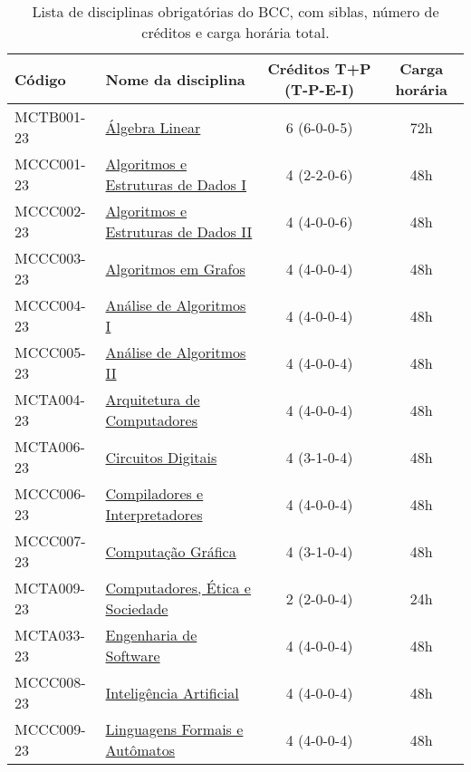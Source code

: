 \begin{table}[h!]
    \caption{Lista de disciplinas obrigatórias do BCC, com siblas, número de créditos e carga horária total.}
    \label{tab:disciplinas_obrigatorias_bcc}

    \centering
    \begin{tabular}{|l|p{}|c|c|}
        \hline
        \textbf{Código} & \textbf{Nome da disciplina} & \textbf{Créditos T+P (T-P-E-I)} & \textbf{Carga horária}\\
        \hline\hline
        MCTB001-23 & \hyperref[disc:alge_lin]{Álgebra Linear} & 6 (6-0-0-5) & 72h \\
        \hline
        MCCC001-23 & \hyperref[disc:aedI]{Algoritmos e Estruturas de Dados I} & 4 (2-2-0-6) & 48h \\
        \hline
        MCCC002-23 & \hyperref[disc:aedII]{Algoritmos e Estruturas de Dados II} & 4 (4-0-0-6) & 48h \\
        \hline
        MCCC003-23 & \hyperref[disc:ag]{Algoritmos em Grafos} & 4 (4-0-0-4) & 48h\\
        \hline
        MCCC004-23 & \hyperref[disc:aaI]{Análise de Algoritmos I} & 4 (4-0-0-4) & 48h \\
        \hline
        MCCC005-23 & \hyperref[disc:aaII]{Análise de Algoritmos II} & 4 (4-0-0-4) & 48h \\
        \hline
        MCTA004-23 & \hyperref[disc:arq]{Arquitetura de Computadores} & 4 (4-0-0-4) & 48h \\
        \hline
        MCTA006-23 & \hyperref[disc:circ_dig]{Circuitos Digitais} & 4 (3-1-0-4) & 48h \\
        \hline
        MCCC006-23 & \hyperref[disc:compi]{Compiladores e Interpretadores} & 4 (4-0-0-4) & 48h \\
        \hline
        MCCC007-23 & \hyperref[disc:cg]{Computação Gráfica} & 4 (3-1-0-4) & 48h  \\
        \hline
        MCTA009-23 & \hyperref[disc:ces]{Computadores, Ética e Sociedade} & 2 (2-0-0-4) & 24h \\
        \hline
        MCTA033-23 & \hyperref[disc:es]{Engenharia de Software} & 4 (4-0-0-4) & 48h \\
        \hline
        MCCC008-23 & \hyperref[disc:ia]{Inteligência Artificial} & 4 (4-0-0-4) & 48h \\
        \hline
        MCCC009-23 & \hyperref[disc:lfa]{Linguagens Formais e Autômatos} & 4 (4-0-0-4) & 48h \\
        \hline

\end{tabular}
\end{table}
